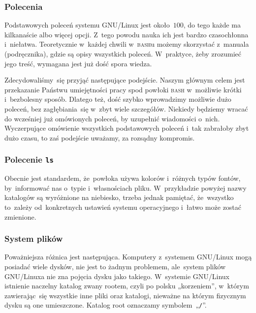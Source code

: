\documentclass[10pt,t]{beamer}
\begin{document}
\begin{frame}
  \frametitle{Polecenia}


  Podstawowych poleceń systemu GNU/Linux jest około~$100$, do tego każde ma
  kilkanaście albo więcej opcji. Z~tego powodu nauka ich jest bardzo
  czasochłonna i~niełatwa. Teoretycznie w~każdej chwili w~\textsc{bash}u
  możemy skorzystać z~manuala (podręcznika), gdzie są opisy wszystkich
  poleceń. W~praktyce, żeby zrozumieć jego treść, wymagana jest już dość
  spora wiedza.

  Zdecydowaliśmy~się przyjąć następujące podejście. Naszym głównym celem
  jest przekazanie Państwu umiejętności pracy spod powłoki \textsc{bash}
  w~możliwie krótki i~bezbolesny sposób. Dlatego też, dość szybko
  wprowadzimy możliwie dużo poleceń, bez zagłębiania~się w~zbyt wiele
  szczegółów. Niekiedy będziemy wracać do wcześniej już omówionych poleceń,
  by uzupełnić wiadomości o~nich. Wyczerpujące omówienie wszystkich
  podstawowych poleceń i~tak zabrałoby zbyt dużo czasu, to zaś podejście
  uważamy, za rozsądny kompromis.

\end{frame}





\begin{frame}
  \frametitle{Polecenie \texttt{ls}}




  Obecnie jest standardem, że~powłoka używa kolorów i~różnych typów fontów,
  by~informować nas o~typie i~własnościach pliku. W~przykładzie powyżej
  nazwy katalogów są wyróżnione na niebiesko, trzeba jednak pamiętać,
  że~wszystko to~zależy od~konkretnych ustawień systemu operacyjnego
  i~łatwo może zostać zmienione.

\end{frame}











\begin{frame}
  \frametitle{System plików}




  Poważniejsza różnica jest następująca. Komputery z~systemem GNU/Linux
  mogą posiadać wiele dysków, nie jest to żadnym problemem, ale~system
  plików GNU/Linuxa nie zna pojęcia dysku jako takiego. W~systemie GNU/Linux
  istnienie naczelny katalog zwany rootem, czyli po polsku „korzeniem”,
  w~którym zawierając~się wszystkie inne pliki oraz katalogi, nieważne na
  którym fizycznym dysku są one umieszczone. Katalog root oznaczamy
  symbolem~„\texttt{/}”.

\end{frame}
\end{document}
